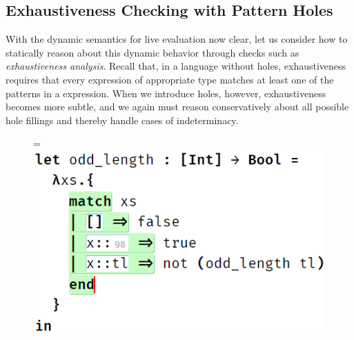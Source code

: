 \subsection{Exhaustiveness Checking with Pattern Holes}\label{sec:exhaustiveness}
With the dynamic semantics for live evaluation now clear, let us consider how to statically reason about this dynamic behavior through checks such as \emph{exhaustiveness analysis}. Recall that, in a language without holes, exhaustiveness requires that every expression of appropriate type matches at least one of the patterns in a  expression. When we introduce holes, however, exhaustiveness becomes more subtle, and we again must reason conservatively about all possible hole fillings and thereby handle cases of indeterminacy.

\begin{figure}
	\centering
	=\hbox{\includegraphics[scale=0.45]{imgs/exhaustive.png}}%
\end{figure}
